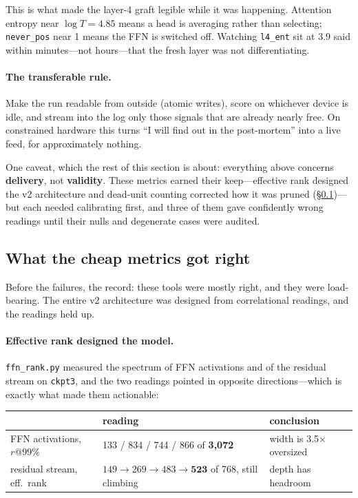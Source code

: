 \documentclass[11pt,a4paper]{article}
\begin{document}
This is what made the layer-4 graft legible while it was happening. Attention entropy near
$\log T = 4.85$ means a head is averaging rather than selecting; \texttt{never\_pos} near 1
means the FFN is switched off. Watching \texttt{l4\_ent} sit at 3.9 said within minutes---not
hours---that the fresh layer was not differentiating.

\paragraph{The transferable rule.} Make the run readable from outside (atomic writes), score on
whichever device is idle, and stream into the log only those signals that are already
nearly free. On constrained hardware this turns ``I will find out in the post-mortem'' into a
live feed, for approximately nothing.

One caveat, which the rest of this section is about: everything above concerns \textbf{delivery},
not \textbf{validity}. These metrics earned their keep---effective rank designed the v2
architecture and dead-unit counting corrected how it was pruned
(\S\ref{sec:gotright})---but each needed calibrating first, and three of them gave confidently
wrong readings until their nulls and degenerate cases were audited.

\subsection{What the cheap metrics got right}\label{sec:gotright}

Before the failures, the record: these tools were mostly right, and they were load-bearing. The
entire v2 architecture was designed from correlational readings, and the readings held up.

\paragraph{Effective rank designed the model.} \texttt{ffn\_rank.py} measured the spectrum of
FFN activations and of the residual stream on \texttt{ckpt3}, and the two readings pointed in
opposite directions---which is exactly what made them actionable:

\begin{center}\small
\begin{tabular}{lll}
\toprule
& reading & conclusion \\
\midrule
FFN activations, $r@99\%$ & 133 / 834 / 744 / 866 of \textbf{3{,}072} & width is 3.5$\times$ oversized \\
residual stream, eff.\ rank & $149 \to 269 \to 483 \to \mathbf{523}$ of 768, still climbing & depth has headroom \\
\bottomrule
\end{tabular}
\end{center}
\end{document}

